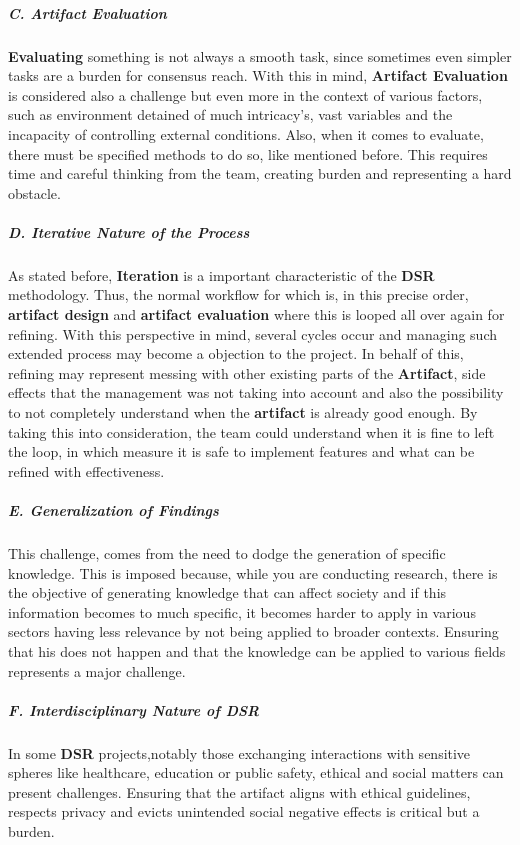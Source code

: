 \subparagraph{C. Artifact Evaluation} \mbox{}

\textbf{Evaluating} something is not always a smooth task, since sometimes even simpler tasks are a burden for consensus reach. With this in mind, \textbf{Artifact Evaluation} is considered also a challenge but even more in the context of various factors, such as environment detained of much intricacy's, vast variables and the incapacity of controlling external conditions. Also, when it comes to evaluate, there must be specified methods to do so, like mentioned before. This requires time and careful thinking from the team, creating burden and representing a hard obstacle. 

\subparagraph{D. Iterative Nature of the Process}\mbox{}

As stated before, \textbf{Iteration} is a important characteristic of the \textbf{DSR} methodology. Thus, the normal workflow for which is, in this precise order, \textbf{artifact design} and \textbf{artifact evaluation} where this is looped all over again for refining. With this perspective in mind, several cycles occur and managing such extended process may become a objection to the project. In behalf of this, refining may represent messing with other existing parts of the \textbf{Artifact}, side effects that the management was not taking into account and also the possibility to not completely understand when the \textbf{artifact} is already good enough. By taking this into consideration, the team could understand when it is fine to left the loop, in which measure it is safe to implement features and what can be refined with effectiveness.

\subparagraph{E. Generalization of Findings}\mbox{}

This challenge, comes from the need to dodge the generation of specific knowledge. This is imposed because, while you are conducting research, there is the objective of generating knowledge that can affect society and if this information becomes to much specific, it becomes harder to apply in various sectors having less relevance by not being applied to broader contexts. Ensuring that his does not happen and that the knowledge can be applied to various fields represents a major challenge.


\subparagraph{F. Interdisciplinary Nature of DSR}\mbox{}

In some \textbf{DSR} projects,notably those exchanging interactions with sensitive spheres like healthcare, education or public safety, ethical and social matters can present challenges. Ensuring that the artifact aligns with ethical guidelines, respects privacy and evicts unintended social negative effects is critical but a burden.

